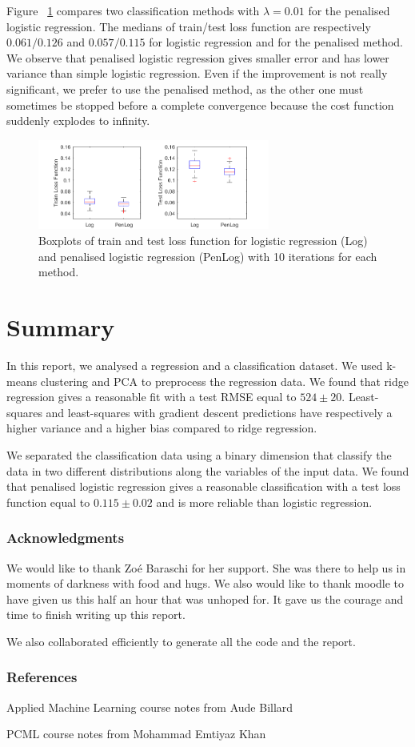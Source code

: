 \documentclass{article} %
\begin{document}
Figure ~\ref{fig:class_compare} compares two classification methods with $\lambda = 0.01$ for the penalised logistic regression. The medians of train/test loss function are respectively $0.061/0.126$ and $0.057/0.115$ for logistic regression and for the penalised method. We observe that penalised logistic regression gives smaller error and has lower variance than simple logistic regression. Even if the improvement is not really significant, we prefer to use the penalised method, as the other one must sometimes be stopped before a complete convergence because the cost function suddenly explodes to infinity.

\begin{figure}[!h] %
	\center
	\includegraphics[width=3.0in]{figures/compareClassification.png}
	\caption{Boxplots of train and test loss function for logistic regression (Log) and penalised logistic regression (PenLog) with 10 iterations for each method.}
	\label{fig:class_compare}
\end{figure}

\section{Summary}
In this report, we analysed a regression and a classification dataset. We used k-means clustering and PCA to preprocess the regression data. We found that ridge regression gives a reasonable fit with a test RMSE equal to $524 \pm 20$. Least-squares and least-squares with gradient descent predictions have respectively a higher variance and a higher bias compared to ridge regression.

We separated the classification data using a binary dimension that classify the data in two different distributions along the variables of the input data. We found that penalised logistic regression gives a reasonable classification with a test loss function equal to $ 0.115 \pm 0.02$ and is more reliable than logistic regression.


\subsubsection*{Acknowledgments}
We would like to thank Zo\'e Baraschi for her support. She was there to help us in moments of darkness with food and hugs. We also would like to thank moodle to have given us this half an hour that was unhoped for. It gave us the courage and time to finish writing up this report.

We also collaborated efficiently to generate all the code and the report.

\subsubsection*{References}
Applied Machine Learning course notes from Aude Billard

PCML course notes from Mohammad Emtiyaz Khan
\end{document}

